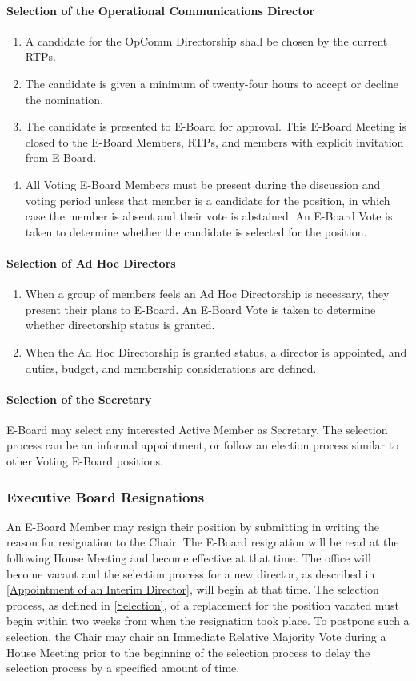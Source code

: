 \documentclass{article}
\newcommand{\asubsection}[1]{\subsubsection{#1} \label{#1}}
\newcommand{\asubsubsection}[1]{\paragraph{#1} \label{#1}}
\begin{document}
\asubsubsection{Selection of the Operational Communications Director}
\renewcommand{\theenumi}{\alph{enumi}} %

\begin{enumerate}
	\item A candidate for the OpComm Directorship shall be chosen by the current RTPs.
	\item The candidate is given a minimum of twenty-four hours to accept or decline the nomination.
	\item The candidate is presented to E-Board for approval.
	      This E-Board Meeting is closed to the E-Board Members, RTPs, and members with explicit invitation from E-Board.
	\item All Voting E-Board Members must be present during the discussion and voting period unless that member is a candidate for the position, in which case the member is absent and their vote is abstained.
	      An E-Board Vote is taken to determine whether the candidate is selected for the position.
\end{enumerate}

\asubsubsection{Selection of Ad Hoc Directors}
\begin{enumerate}
	\item When a group of members feels an Ad Hoc Directorship is necessary, they present their plans to E-Board.
	      An E-Board Vote is taken to determine whether directorship status is granted.
	\item When the Ad Hoc Directorship is granted status, a director is appointed, and duties, budget, and membership considerations are defined.
\end{enumerate}

\asubsubsection{Selection of the Secretary}
E-Board may select any interested Active Member as Secretary.
The selection process can be an informal appointment, or follow an election process similar to other Voting E-Board positions.

\asubsection{Executive Board Resignations}
An E-Board Member may resign their position by submitting in writing the reason for resignation to the Chair.
The E-Board resignation will be read at the following House Meeting and become effective at that time.
The office will become vacant and the selection process for a new director, as described in \ref{Appointment of an Interim Director}, will begin at that time.
The selection process, as defined in \ref{Selection}, of a replacement for the position vacated must begin within two weeks from when the resignation took place.
To postpone such a selection, the Chair may chair an Immediate Relative Majority Vote during a House Meeting prior to the beginning of the selection process to delay the selection process by a specified amount of time.
\end{document}
